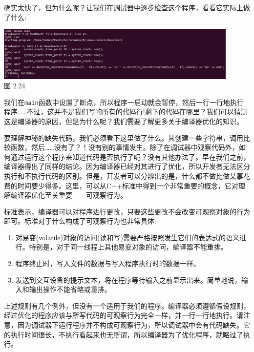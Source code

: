 确实太快了，但为什么呢？让我们在调试器中逐步检查这个程序，看看它实际上做了什么:

\begin{center}
\includegraphics[width=0.9\textwidth]{content/1/chapter2/images/24.jpg}\\
图 2.24
\end{center}

我们在\texttt{main}函数中设置了断点，所以程序一启动就会暂停，然后一行一行地执行程序……不过，这并不是我们写的所有的代码行!剩下的代码在哪里？我们可以猜测这是编译器的原因，但是为什么呢？我们需要了解更多关于编译器优化的知识。


要理解神秘的缺失代码，我们必须看下这里做了什么。其创建一些字符串，调用比较函数，然后……没有了？！没有别的事情发生。除了在调试器中观察代码外，如何通过运行这个程序来知道代码是否执行了呢？没有其他办法了。早在我们之前，编译器得出了同样的结论。因为编译器已经对其进行了优化，所以开发者无法区分执行和不执行代码的区别。但是，开发者可以分辨出的是，什么都不做比做某事花费的时间要少得多。这里，可以从C++标准中得到一个非常重要的概念，它对理解编译器优化至关重要——可观察行为。

标准表示，编译器可以对程序进行更改，只要这些更改不会改变可观察对象的行为即可。标准对于什么构成了可观察行为也非常具体:

\begin{enumerate}
\item 对易变(volatile)对象的访问(读和写)需要严格按照发生它们的表达式的语义进行。特别是，对于同一线程上其他易变对象的访问，编译器不能重排。

\item 程序终止时，写入文件的数据与写入程序执行时的数据一样。

\item 发送到交互设备的提示文本，将在程序等待输入之前显示出来。简单地说，输入和输出操作不能省略或重排。
\end{enumerate}

上述规则有几个例外，但没有一个适用于我们的程序。编译器必须遵循假设规则，经过优化的程序应该与所写代码的可观察行为完全一样，并一行一行地执行。请注意，因为调试器下运行程序并不构成可观察行为，所以调试器中会有代码缺失。它的执行时间很长，不执行看起来也无所谓，所以编译器为了优化程序，就略过了执行。

